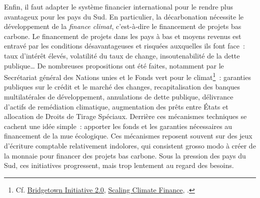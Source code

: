 \documentclass[a5paper,french,openany]{memoir}
\begin{document}
Enfin, il faut adapter le système financier international pour le rendre plus avantageux pour les pays du Sud. En particulier, la décarbonation nécessite le développement de la \textit{finance climat}, c'est-à-dire le financement de projets bas carbone. Le financement de projets dans les pays à bas et moyens revenus est entravé par les conditions désavantageuses et risquées auxquelles ils font face~: taux d'intérêt élevés, volatilité du taux de change, insoutenabilité de la dette publique\dots{} De nombreuses propositions ont été faites, notamment par le Secrétariat général des Nations unies et le Fonds vert pour le climat\footnote{Cf. \href{https://www.un.org/sustainabledevelopment/blog/2023/04/press-release-with-clock-ticking-for-the-sdgs-un-chief-and-barbados-prime-minister-call-for-urgent-action-to-transform-broken-global-financial-system/}{Bridgetown Initiative 2.0}, \href{https://www.greenclimate.fund/sites/default/files/document/scaling-climate-finance-context-covid-19-full-report\_0.pdf}{Scaling Climate Finance}, \citet{hourcade_accelerating_2021}.}~: garanties publiques sur le crédit et le marché des changes, recapitalisation des banques multilatérales de développement, annulations de dette publique, délivrance d'actifs de remédiation climatique, augmentation des prêts entre États et allocation de Droits de Tirage Spéciaux. Derrière ces mécanismes techniques se cachent une idée simple~: apporter les fonds et les garanties nécessaires au financement de la mue écologique. Ces mécanismes reposent souvent sur des jeux d'écriture comptable relativement indolores, qui consistent grosso modo à créer de la monnaie pour financer des projets bas carbone. Sous la pression des pays du Sud, ces initiatives progressent, mais trop lentement au regard des besoins.

\end{document}
